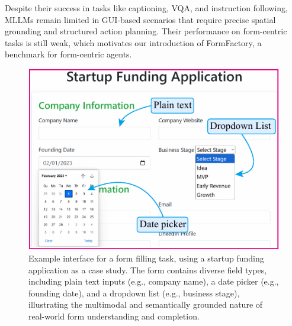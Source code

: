 \documentclass[sigconf, screen, review]{acmart}
\begin{document}
Despite their success in tasks like captioning, VQA, and instruction following, MLLMs remain limited in GUI-based scenarios that require precise spatial grounding and structured action planning. Their performance on form-centric tasks is still weak, which motivates our introduction of FormFactory, a benchmark for form-centric agents.


\begin{figure}[!tbp]
    \centering
    \includegraphics[width=0.78\linewidth]{figs/fig2.pdf}
    \caption{Example interface for a form filling task, using a startup funding application as a case study. The form contains diverse field types, including plain text inputs (e.g., company name), a date picker (e.g., founding date), and a dropdown list (e.g., business stage), illustrating the multimodal and semantically grounded nature of real-world form understanding and completion.}
    \label{fig:fig2}
\end{figure}


\end{document}
